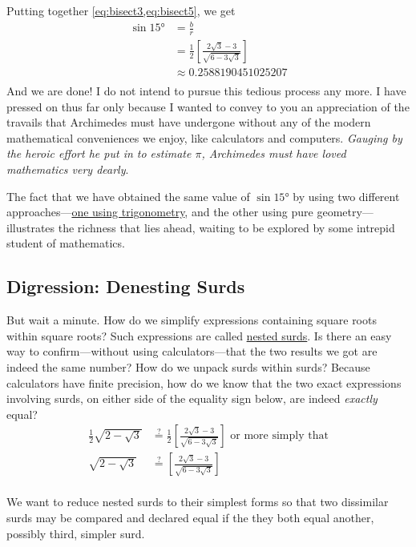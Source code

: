 \documentclass[
  a4paper,
]{article}
\begin{document}
Putting together \cref{eq:bisect3,eq:bisect5}, we get \[
\begin{aligned}
\sin 15° &= \frac{b}{r}\\
&= \frac{1}{2}\left[\frac{2\sqrt{3} - 3}{\sqrt{6 - 3\sqrt{3}}}\right]\\[1em]
&\approx 0.2588190451025207\\
\end{aligned}
\] And we are done! I do not intend to pursue this tedious process any
more. I have pressed on thus far only because I wanted to convey to you
an appreciation of the travails that Archimedes must have undergone
without any of the modern mathematical conveniences we enjoy, like
calculators and computers. \emph{Gauging by the heroic effort he put in
to estimate \(\pi\), Archimedes must have loved mathematics very
dearly}.

The fact that we have obtained the same value of \(\sin 15°\) by using
two different approaches---\hyperref[the-half-angle-formulae]{one using
trigonometry}, and the other using pure geometry--- illustrates the
richness that lies ahead, waiting to be explored by some intrepid
student of mathematics.

\subsection{Digression: Denesting
Surds}\label{digression-denesting-surds}

But wait a minute. How do we simplify expressions containing square
roots within square roots? Such expressions are called
\href{https://undergroundmathematics.org/thinking-about-algebra/nested-surds/solution}{nested
surds}. Is there an easy way to confirm---without using
calculators---that the two results we got are indeed the same number?
How do we unpack surds within surds? Because calculators have finite
precision, how do we know that the two exact expressions involving
surds, on either side of the equality sign below, are indeed
\emph{exactly} equal? \[
\begin{aligned}
\frac{1}{2}\sqrt{2 - \sqrt{3}} &\overset{?}{=} \frac{1}{2}\left[\frac{2\sqrt{3} - 3}{\sqrt{6 - 3\sqrt{3}}}\right]\mbox{ or more simply that}\\
\sqrt{2 - \sqrt{3}}&\overset{?}{=} \left[\frac{2\sqrt{3} - 3}{\sqrt{6 - 3\sqrt{3}}}\right]\\
\end{aligned}
\]

We want to reduce nested surds to their simplest forms so that two
dissimilar surds may be compared and declared equal if the they both
equal another, possibly third, simpler surd.
\end{document}
